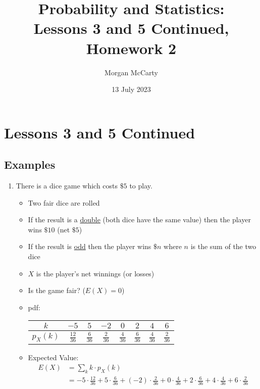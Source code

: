 \documentclass[12pt]{article}
\title{
    Probability and Statistics:\\
    Lessons 3 and 5 Continued, Homework 2}
\author{Morgan McCarty}
\date{13 July 2023}
\begin{document}
    \maketitle

    \section{Lessons 3 and 5 Continued}
        \subsection{Examples}
            \begin{enumerate}
                \item There is a dice game which costs $\$5$ to play.
                \begin{itemize}
                    \item Two fair dice are rolled
                    \item If the result is a \underline{double} (both dice have the same value) then the player wins $\$10$ (net $\$5$)
                    \item If the result is \underline{odd} then the player wins $\$n$ where $n$ is the sum of the two dice
                    \item $X$ is the player's net winnings (or losses)
                    \item Is the game fair? ($E(X) = 0$)
                    \item pdf:
                    \begin{tabular}{|c|c|c|c|c|c|c|c|}
                        \hline
                        $k$ & $-5$ & $5$ & $-2$ & $0$ & $2$ & $4$ & $6$ \\
                        \hline
                        $p_X(k)$ & $\frac{12}{36}$ & $\frac{6}{36}$ & $\frac{2}{36}$ & $\frac{4}{36}$ & $\frac{6}{36}$ & $\frac{4}{36}$ & $\frac{2}{36}$ \\ 
                        \hline
                    \end{tabular}
                    \item Expected Value:
                    \begin{align*}
                        E(X) &= \sum_{k} k \cdot p_X(k) \\
                        &= -5 \cdot \frac{12}{36} + 5 \cdot \frac{6}{36} + (-2) \cdot \frac{2}{36} + 0 \cdot \frac{4}{36} + 2 \cdot \frac{6}{36} + 4 \cdot \frac{4}{36} + 6 \cdot \frac{2}{36} \\

\end{align*}
\end{itemize}
\end{enumerate}
\end{document}
